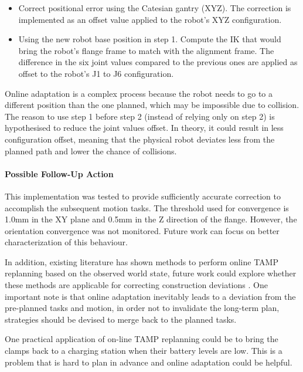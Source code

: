 \begin{itemize}
	\item Correct positional error using the Catesian gantry (XYZ). The correction is implemented as an offset value applied to the robot’s XYZ configuration.

	\item Using the new robot base position in step 1. Compute the IK that would bring the robot’s flange frame to match with the alignment frame. The difference in the six joint values compared to the previous ones are applied as offset to the robot’s J1 to J6 configuration.

\end{itemize}
Online adaptation is a complex process because the robot needs to go to a different position than the one planned, which may be impossible due to collision. The reason to use step 1 before step 2 (instead of relying only on step 2) is hypothesised to reduce the joint values offset. In theory, it could result in less configuration offset, meaning that the physical robot deviates less from the planned path and lower the chance of collisions. 

\paragraph{Possible Follow-Up Action}

This implementation was tested to provide sufficiently accurate correction to accomplish the subsequent motion tasks. The threshold used for convergence is 1.0mm in the XY plane and 0.5mm in the Z direction of the flange. However, the orientation convergence was not monitored. Future work can focus on better characterization of this behaviour. 

In addition, existing literature has shown methods to perform online TAMP replanning based on the observed world state, future work could explore whether these methods are applicable for correcting construction deviations \parencite{elbanhawiSamplingBasedRobotMotion2014, otteMathrmRRTRealTime2015}. One important note is that online adaptation inevitably leads to a deviation from the pre-planned tasks and motion, in order not to invalidate the long-term plan, strategies should be devised to merge back to the planned tasks.

One practical application of on-line TAMP replanning could be to bring the clamps back to a charging station when their battery levels are low. This is a problem that is hard to plan in advance and online adaptation could be helpful. 

